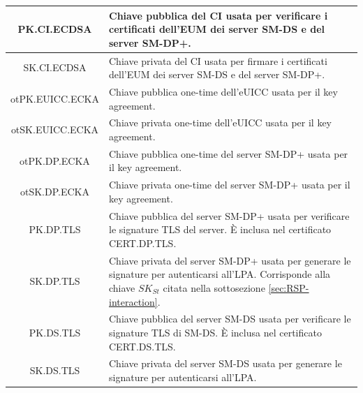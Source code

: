 \documentclass[10pt, twoside, openany]{book}
\begin{document}
\begin{table}[h!]
\begin{center}
\begin{tabularx}{\textwidth}{|c|X|}
\hline
PK.CI.ECDSA &  Chiave pubblica del CI usata per verificare i certificati dell'EUM dei server SM-DS e del server SM-DP+.\\
\hline
SK.CI.ECDSA & Chiave privata del CI usata per firmare i certificati dell'EUM dei server SM-DS e del server SM-DP+.\\
\hline
otPK.EUICC.ECKA & Chiave pubblica one-time dell'eUICC usata per il key agreement.\\
\hline
otSK.EUICC.ECKA & Chiave privata one-time dell'eUICC usata per il key agreement.\\
\hline
otPK.DP.ECKA & Chiave pubblica one-time del server SM-DP+ usata per il key agreement.\\
\hline
otSK.DP.ECKA & Chiave privata one-time del server SM-DP+ usata per il key agreement.\\
\hline
PK.DP.TLS & Chiave pubblica del server SM-DP+ usata per verificare le signature TLS del server. È inclusa nel certificato CERT.DP.TLS.\\
\hline
SK.DP.TLS & Chiave privata del server SM-DP+ usata per generare le signature per autenticarsi all'LPA. Corrisponde alla chiave $SK_{St}$ citata nella sottosezione \ref{sec:RSP-interaction}.\\
\hline
PK.DS.TLS & Chiave pubblica del server SM-DS usata per verificare le signature TLS di SM-DS. È inclusa nel certificato CERT.DS.TLS.\\
\hline
SK.DS.TLS & Chiave privata del server SM-DS usata per generare le signature per autenticarsi all'LPA.\\
\hline
\end{tabularx}
\end{center}
\end{table}
\end{document}
